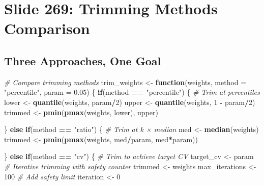 \documentclass[
]{article}
\newenvironment{Shaded}{\begin{snugshade}}{\end{snugshade}}
\newcommand{\AttributeTok}[1]{\textcolor[rgb]{0.13,0.29,0.53}{#1}}
\newcommand{\CommentTok}[1]{\textcolor[rgb]{0.56,0.35,0.01}{\textit{#1}}}
\newcommand{\ControlFlowTok}[1]{\textcolor[rgb]{0.13,0.29,0.53}{\textbf{#1}}}
\newcommand{\DecValTok}[1]{\textcolor[rgb]{0.00,0.00,0.81}{#1}}
\newcommand{\FloatTok}[1]{\textcolor[rgb]{0.00,0.00,0.81}{#1}}
\newcommand{\FunctionTok}[1]{\textcolor[rgb]{0.13,0.29,0.53}{\textbf{#1}}}
\newcommand{\NormalTok}[1]{#1}
\newcommand{\OtherTok}[1]{\textcolor[rgb]{0.56,0.35,0.01}{#1}}
\newcommand{\SpecialCharTok}[1]{\textcolor[rgb]{0.81,0.36,0.00}{\textbf{#1}}}
\newcommand{\StringTok}[1]{\textcolor[rgb]{0.31,0.60,0.02}{#1}}
\begin{document}
\section{Slide 269: Trimming Methods
Comparison}\label{slide-269-trimming-methods-comparison}

\subsection{Three Approaches, One Goal}\label{three-approaches-one-goal}

\begin{Shaded}
\begin{Highlighting}[]
\CommentTok{\# Compare trimming methods}
\NormalTok{trim\_weights }\OtherTok{\textless{}{-}} \ControlFlowTok{function}\NormalTok{(weights, }\AttributeTok{method =} \StringTok{"percentile"}\NormalTok{, }\AttributeTok{param =} \FloatTok{0.05}\NormalTok{) \{}
  \ControlFlowTok{if}\NormalTok{(method }\SpecialCharTok{==} \StringTok{"percentile"}\NormalTok{) \{}
    \CommentTok{\# Trim at percentiles}
\NormalTok{    lower }\OtherTok{\textless{}{-}} \FunctionTok{quantile}\NormalTok{(weights, param}\SpecialCharTok{/}\DecValTok{2}\NormalTok{)}
\NormalTok{    upper }\OtherTok{\textless{}{-}} \FunctionTok{quantile}\NormalTok{(weights, }\DecValTok{1} \SpecialCharTok{{-}}\NormalTok{ param}\SpecialCharTok{/}\DecValTok{2}\NormalTok{)}
\NormalTok{    trimmed }\OtherTok{\textless{}{-}} \FunctionTok{pmin}\NormalTok{(}\FunctionTok{pmax}\NormalTok{(weights, lower), upper)}
    
\NormalTok{  \} }\ControlFlowTok{else} \ControlFlowTok{if}\NormalTok{(method }\SpecialCharTok{==} \StringTok{"ratio"}\NormalTok{) \{}
    \CommentTok{\# Trim at k × median}
\NormalTok{    med }\OtherTok{\textless{}{-}} \FunctionTok{median}\NormalTok{(weights)}
\NormalTok{    trimmed }\OtherTok{\textless{}{-}} \FunctionTok{pmin}\NormalTok{(}\FunctionTok{pmax}\NormalTok{(weights, med}\SpecialCharTok{/}\NormalTok{param, med}\SpecialCharTok{*}\NormalTok{param))}
    
\NormalTok{  \} }\ControlFlowTok{else} \ControlFlowTok{if}\NormalTok{(method }\SpecialCharTok{==} \StringTok{"cv"}\NormalTok{) \{}
    \CommentTok{\# Trim to achieve target CV}
\NormalTok{    target\_cv }\OtherTok{\textless{}{-}}\NormalTok{ param}
    \CommentTok{\# Iterative trimming with safety counter}
\NormalTok{    trimmed }\OtherTok{\textless{}{-}}\NormalTok{ weights}
\NormalTok{    max\_iterations }\OtherTok{\textless{}{-}} \DecValTok{100}  \CommentTok{\# Add safety limit}
\NormalTok{    iteration }\OtherTok{\textless{}{-}} \DecValTok{0}
    

\end{Highlighting}
\end{Shaded}
\end{document}
